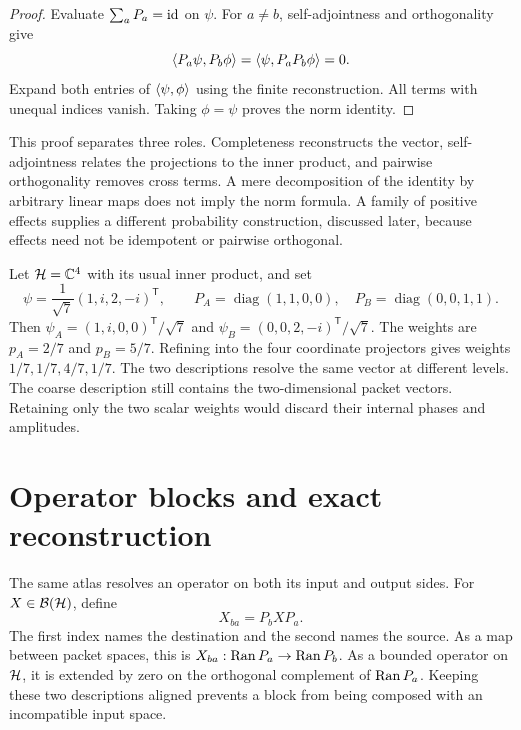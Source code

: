 \begin{proof}
Evaluate $\sum_aP_a=\mathrm{id}$ on $\psi$. For $a\ne b$, self-adjointness and orthogonality give
\[
 \left\langle P_a\psi,P_b\phi\right\rangle
 =\left\langle\psi,P_aP_b\phi\right\rangle=0.
\]
Expand both entries of $\left\langle\psi,\phi\right\rangle$ using the finite reconstruction. All terms with unequal indices vanish. Taking $\phi=\psi$ proves the norm identity.
\end{proof}

This proof separates three roles. Completeness reconstructs the vector, self-adjointness relates the projections to the inner product, and pairwise orthogonality removes cross terms. A mere decomposition of the identity by arbitrary linear maps does not imply the norm formula. A family of positive effects supplies a different probability construction, discussed later, because effects need not be idempotent or pairwise orthogonal.

\begin{example}\label{f:four-coordinate}
Let $\mathcal H=\mathbb C^4$ with its usual inner product, and set
\[
 \psi=\frac1{\sqrt7}(1,i,2,-i)^{\mathsf T},\qquad
 P_A=\operatorname{diag}(1,1,0,0),\quad
 P_B=\operatorname{diag}(0,0,1,1).
\]
Then $\psi_A=(1,i,0,0)^{\mathsf T}/\sqrt7$ and
$\psi_B=(0,0,2,-i)^{\mathsf T}/\sqrt7$. The weights are $p_A=2/7$ and $p_B=5/7$. Refining into the four coordinate projectors gives weights $1/7,1/7,4/7,1/7$. The two descriptions resolve the same vector at different levels. The coarse description still contains the two-dimensional packet vectors. Retaining only the two scalar weights would discard their internal phases and amplitudes.
\end{example}




\section{Operator blocks and exact reconstruction}\label{f:corners}

The same atlas resolves an operator on both its input and output sides. For $X\in\mathcal B(\mathcal H)$, define
\begin{equation}\label{f:corner-def}
 X_{ba}=P_bXP_a.
\end{equation}
The first index names the destination and the second names the source. As a map between packet spaces, this is $X_{ba}:\operatorname{Ran} P_a\to\operatorname{Ran} P_b$. As a bounded operator on $\mathcal H$, it is extended by zero on the orthogonal complement of $\operatorname{Ran} P_a$. Keeping these two descriptions aligned prevents a block from being composed with an incompatible input space.

